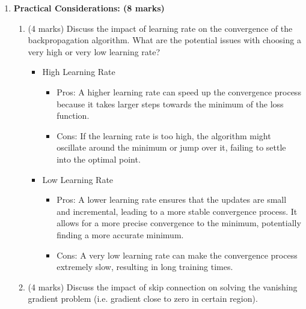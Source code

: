 \documentclass[12pt]{article}
\begin{document}
\begin{enumerate}[font=\Large]
	      \newpage
	\item \textbf{Practical Considerations: (8 marks)}
	      \begin{enumerate}[label=(\alph*)]
		      \item (4 marks) Discuss the impact of learning rate on the convergence of the backpropagation algorithm. What are the potential issues with choosing a very high or very low learning rate?
		            \begin{itemize}
			            \item High Learning Rate
			                  \begin{itemize}
				                  \item Pros: A higher learning rate can speed up the convergence process because it takes larger steps towards the minimum of the loss function.
				                  \item Cons: If the learning rate is too high, the algorithm might oscillate around the minimum or jump over it, failing to settle into the optimal point.
			                  \end{itemize}
			            \item Low Learning Rate
			                  \begin{itemize}
				                  \item Pros: A lower learning rate ensures that the updates are small and incremental, leading to a more stable convergence process. It allows for a more precise convergence to the minimum, potentially finding a more accurate minimum.
				                  \item Cons: A very low learning rate can make the convergence process extremely slow, resulting in long training times.
			                  \end{itemize}
		            \end{itemize}

		      \item (4 marks) Discuss the impact of skip connection on solving the vanishing gradient problem (i.e. gradient close to zero in certain region).


\end{enumerate}
\end{enumerate}
\end{document}
